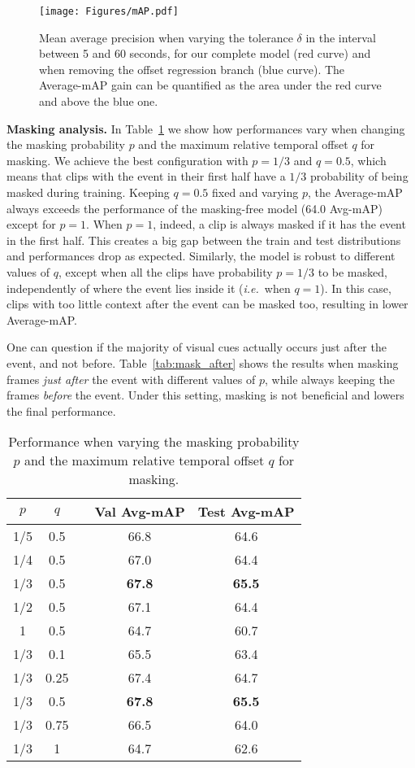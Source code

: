 \documentclass[a4paper,conference]{IEEEtran}
\newcommand{\tit}[1]{\smallbreak\noindent\textbf{#1.}}
\def \ie {\emph{i.e.}}
\begin{document}
\begin{figure}[t]
\centering
\texttt{[image: Figures/mAP.pdf]}
\caption{Mean average precision when varying the tolerance $\delta$ in the interval between 5 and 60 seconds, for our complete model (red curve) and when removing the offset regression branch (blue curve). The Average-mAP gain can be quantified as the area under the red curve and above the blue one.}
\label{fig:mAP}
\end{figure}

\tit{Masking analysis}
In Table~\ref{tab:mask_bafore} we show how performances vary when changing the masking probability $p$ and the  maximum relative temporal offset $q$ for masking. We achieve the best configuration with $p=1/3$ and $q=0.5$, which means that clips with the event in their first half have a $1/3$ probability of being masked during training. Keeping $q=0.5$ fixed and varying $p$, the Average-mAP always exceeds the performance of the masking-free model (64.0 Avg-mAP) except for $p=1$. When $p=1$, indeed, a clip is always masked if it has the event in the first half. This creates a big gap between the train and test distributions and performances drop as expected. Similarly, the model is robust to different values of $q$, except when all the clips have probability $p=1/3$ to be masked, independently of where the event lies inside it (\ie~when $q=1$). In this case, clips with too little context after the event can be masked too, resulting in lower Average-mAP.

One can question if the majority of visual cues actually occurs just after the event, and not before. Table~\ref{tab:mask_after} shows the results when masking frames \textit{just after} the event with different values of $p$, while always keeping the frames \textit{before} the event. Under this setting, masking is not beneficial and lowers the final performance.

\begin{table}[t]
\centering
\caption{Performance when varying the masking probability $p$ and the maximum relative temporal offset $q$ for masking.}
\begin{tabular}{ccccc}
    \toprule 
    $p$ & $q$ & & Val Avg-mAP & Test Avg-mAP \\
    \midrule
    1/5 & 0.5 & & 66.8 & 64.6 \\
    1/4 & 0.5 & & 67.0 & 64.4 \\
    1/3 & 0.5 & & \textbf{67.8} & \textbf{65.5} \\
    1/2 & 0.5 & & 67.1 & 64.4 \\
    1 & 0.5 & & 64.7 & 60.7 \\
    \cmidrule{1-2}
    \cmidrule{4-5}
    1/3 & 0.1 & & 65.5 & 63.4 \\
    1/3 & 0.25 & & 67.4 & 64.7 \\
    1/3 & 0.5 & & \textbf{67.8} & \textbf{65.5} \\
    1/3 & 0.75 & & 66.5 & 64.0 \\
    1/3 & 1 & & 64.7 & 62.6 \\
    \bottomrule
\end{tabular}
\label{tab:mask_bafore}
\end{table}
\end{document}
